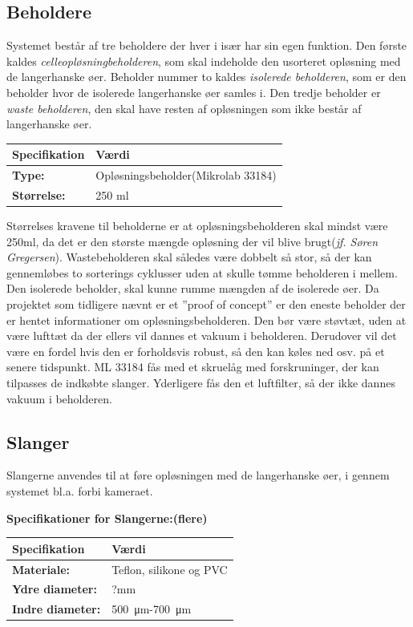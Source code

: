 \subsection{Beholdere}
Systemet består af tre beholdere der hver i især har sin egen funktion. Den første kaldes \textit{celleopløsningbeholderen}, som skal indeholde den usorteret opløsning med de langerhanske øer. Beholder nummer to kaldes \textit{isolerede beholderen}, som er den beholder hvor de isolerede langerhanske øer samles i. Den tredje beholder er \textit{waste beholderen}, den skal have resten af opløsningen som ikke består af langerhanske øer.
\begin{center}
		\begin{longtable}{ | m{6.5cm} | m{6.5cm}| } 
			\hline
			\textbf{Specifikation} &\textbf{Værdi} \\ 
			\hline
			\textbf{Type:} & Opløsningsbeholder(Mikrolab 33184) \\ 
			\hline
			\textbf{Størrelse:} & 250 ml \\ 
			\hline
		\end{longtable}
\end{center}
Størrelses kravene til beholderne er at opløsningsbeholderen skal mindst være 250ml, da det er den største mængde opløsning der vil blive brugt(\textit{jf. Søren Gregersen}). Wastebeholderen skal således være dobbelt så stor, så der kan gennemløbes to sorterings cyklusser uden at skulle tømme beholderen i mellem. Den isolerede beholder, skal kunne rumme mængden af de isolerede øer. Da projektet som tidligere nævnt er et ”proof of concept” er den eneste beholder der er hentet informationer om opløsningsbeholderen. Den bør være støvtæt, uden at være lufttæt da der ellers vil dannes et vakuum i beholderen. Derudover vil det være en fordel hvis den er forholdsvis robust, så den kan køles ned osv. på et senere tidspunkt. ML 33184 fås med et skruelåg med forskruninger, der kan tilpasses de indkøbte slanger. Yderligere fås den et luftfilter, så der ikke dannes vakuum i beholderen.

\subsection{Slanger}
Slangerne anvendes til at føre opløsningen med de langerhanske øer, i gennem systemet bl.a. forbi kameraet.

\textbf{Specifikationer for Slangerne:(flere)} 
\begin{center}
		\begin{longtable}{ | m{6.5cm} | m{6.5cm}| } 
			\hline
			\textbf{Specifikation} &\textbf{Værdi} \\ 
			\hline
			\textbf{Materiale:} & Teflon, silikone og PVC \\ 
			\hline
			\textbf{Ydre diameter:} & ?mm  \\ 
			\hline
			\textbf{Indre diameter:} & \SI{500}{\micro\metre}-\SI{700}{\micro\metre}  \\ 
			\hline			
		\end{longtable}
\end{center}

